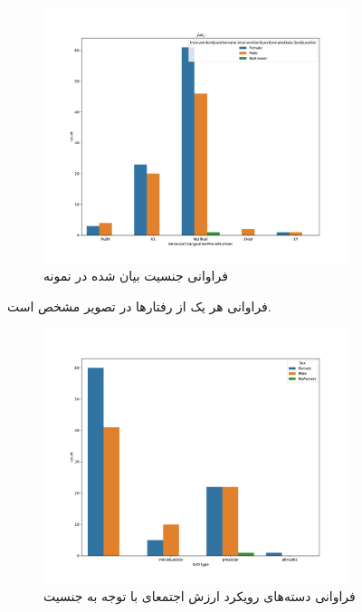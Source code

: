 \begin{figure}[htpb]
    \centering
    \includegraphics[width=0.8\textwidth]{./img/Frequency_Behavior_Phnone_Number.pdf}
    \caption{فراوانی جنسیت بیان شده در نمونه}
    \label{fig:Frequency_Behavior_Phnone_Number}
\end{figure}

فراوانی هر یک از رفتارها در
تصویر \label{fig:Frequency_Behavior_Phnone_Number}
مشخص است.

\begin{figure}[htpb]
    \centering
    \includegraphics[width=0.8\textwidth]{./img/sexualityAndSVOAgainstPopulation.pdf}
    \caption{فراوانی دسته‌های رویکرد ارزش اجتمعای با توجه به جنسیت}
    \label{fig:sexualityAndSVOAgainstPopulation}
\end{figure}


